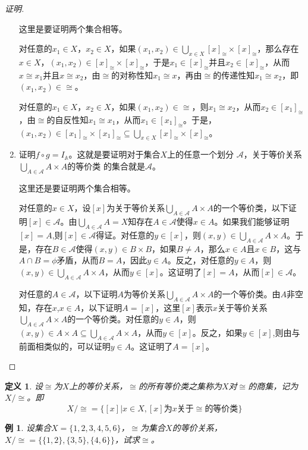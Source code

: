 \documentclass{article}
\newtheorem{Def}{定义}
\newtheorem{Example}{例}
\begin{document}
\begin{CJK*}{UTF8}{gbsn}
\begin{proof}[证明]
\begin{enumerate}
      这里是要证明两个集合相等。

      对任意的$x_1\in X$，$x_2\in X$，如果$(x_1,x_2)\in \bigcup_{x\in X}[x]_{\cong}\times [x]_{\cong}$，那么存在$x\in X$，$(x_1,x_2)\in [x]_{\cong}\times [x]_{\cong}$，于是$x_1\in [x]_{\cong}$并且$x_2\in [x]_{\cong}$，从而$x\cong x_1$并且$x\cong x_2$，由$\cong$的对称性知$x_1\cong x$，再由$\cong$的传递性知$x_1\cong x_2$，即$(x_1,x_2)\in \cong$。

      对任意的$x_1\in X$，$x_2\in X$，如果$(x_1,x_2)\in \cong$，则$x_1\cong x_2$，从而$x_2\in [x_1]_{\cong}$，由$\cong$的自反性知$x_1\cong x_1$，从而$x_1\in [x_1]_{\cong}$。于是，$(x_1,x_2)\in [x_1]_{\cong}\times [x_1]_{\cong}\subseteq \bigcup_{x\in X}[x]_{\cong}\times [x]_{\cong}$。
    \item 证明$f\circ g = I_{\mathbb{A}}$。这就是要证明对于集合$X$上的任意一个划分
      $\mathscr{A}$，关于等价关系$\bigcup_{A \in \mathscr{A}}A\times A$的等价类
      的集合就是$\mathscr{A}$。

      这里还是要证明两个集合相等。

      对任意的$x\in X$，设$[x]$为关于等价关系$\bigcup_{A \in \mathscr{A}}A\times A$的一个等价类，以下证明$[x]\in \mathscr{A}$。由$\bigcup_{A\in \mathscr{A}}A=X$知存在$A\in \mathscr{A}$使得$x\in A$。如果我们能够证明$[x]=A$,则$[x]\in \mathscr{A}$得证。对任意的$y\in [x]$，则$(x,y)\in \bigcup_{A \in \mathscr{A}}A\times A$。于是，存在$B\in \mathscr{A}$使得$(x,y)\in B\times B$，如果$B\neq A$，那么$x\in A$且$x\in B$，这与$A\cap B=\phi$矛盾，从而$B=A$，因此$y\in A$。反之，对任意的$y\in A$，则$(x,y)\in \bigcup_{A \in \mathscr{A}}A\times A$，从而$y\in [x]$。这证明了$[x]=A$，从而$[x]\in \mathscr{A}$。

      对任意的$A\in \mathscr{A}$，以下证明$A$为等价关系$\bigcup_{A \in \mathscr{A}}A\times A$的一个等价类。由$A$非空知，存在$x$,$x\in A$，以下证明$A=[x]$，这里$[x]$表示$x$关于等价关系$\bigcup_{A \in \mathscr{A}}A\times A$的一个等价类。对任意的$y\in A$，则$(x,y)\in A\times A \subseteq \bigcup_{A \in \mathscr{A}}A\times A$，从而$y\in [x]$。反之，如果$y\in [x]$,则由与前面相类似的，可以证明$y\in A$。这证明了$A=[x]$。
    \end{enumerate}
  \end{proof}
  \begin{Def}
    设$\cong$为$X$上的等价关系，$\cong$的所有等价类之集称为$X$对$\cong$的商集，记为$X/\cong$。即
    \[X/\cong = \{[x]|x\in X,[x]\text{为}x\text{关于}\cong \text{的等价类}\}\]
  \end{Def}

  \begin{Example}
    设集合$X=\{1,2,3,4,5,6\}$，$\cong$为集合$X$的等价关系，$X/\cong=\{\{1,2\},\{3,5\},\{4,6\}\}$，试求$\cong$。
  \end{Example}


\end{CJK*}
\end{document}
